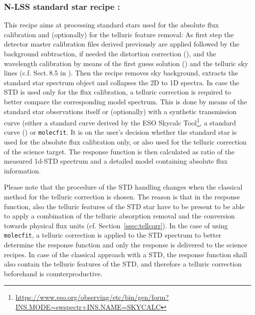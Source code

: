 \clearpage

\subsubsection{N-LSS standard star recipe :}\label{rec:metis_n_lss_std}
This recipe aims at processing standard stars used for the absolute flux calibration and (optionally) for the telluric feature removal: As first step the detector master calibration files derived previously are applied followed by the background subtraction, if needed the distortion correction (\hyperref[dataitem:n_lss_dist_sol]{}), and
the wavelength calibration by means of the first guess solution (\hyperref[dataitem:n_lss_wave_guess]{}) and the telluric sky lines (c.f. Sect.\,8.5 in \cite{DRLS}). Then the recipe removes sky background, extracts the standard star spectrum object and collapses the 2D to 1D spectra. In case the \ac{STD} is used only for the flux calibration, a telluric correction is required to better compare the corresponding model spectrum. This is done by means of the standard star observations itself or (optionally) with a synthetic transmission curve (either a standard curve derived by the ESO Skycalc Tool\footnote{\url{https://www.eso.org/observing/etc/bin/gen/form?INS.MODE=swspectr+INS.NAME=SKYCALC}}, a standard curve (\hyperref[dataitem:n_synth_trans]{}) or \texttt{molecfit}. It is on the user's decision whether the standard star is used for the absolute flux calibration only, or also used for the telluric correction of the science target. The response function is then calculated as ratio of the measured 1d-\ac{STD} spectrum and a detailed model containing absolute flux information.

Please note that the procedure of the \ac{STD} handling changes when the classical method for the telluric correction is chosen. The reason is that in the response function, also the telluric features of the \ac{STD} star have to be present to be able to apply a combination of the telluric absorption removal and the conversion towards physical flux units (cf. Section~\ref{ssec:tellcorr}). In the case of using \texttt{molecfit}, a telluric correction is applied to the \ac{STD} spectrum to better determine the response function and only the response is delivered to the science recipes. In case of the classical approach with a \ac{STD}, the response function shall also contain the telluric features of the \ac{STD}, and therefore a telluric correction beforehand is counterproductive.\\

